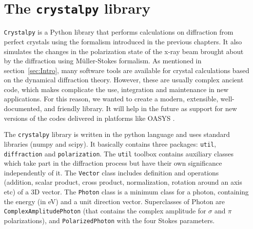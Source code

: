 \documentclass[preprint]{iucr}              %
\newcommand{\todo}[1]{{\color{red}[TODO: "#1'']}}
\newcommand{\inred}[1]{{\color{red}#1}}
\begin{document}




\section{The {\tt crystalpy} library}
\label{sec:crystalpy}

{\tt Crystalpy} is a Python library that performs calculations on diffraction
from perfect crystals using the formalism introduced in the previous chapters. It also simulates the changes in the polarization state of the x-ray beam brought
about by the diffraction using Müller-Stokes formalism. 
As mentioned in section~\ref{sec:Intro}, many software tools are available for crystal calculations based on the dynamical diffraction theory. However, these are usually complex ancient code, which makes complicate the use, integration and maintenance in new applications. For this reason, we wanted to create a modern, extensible, well-documented, and friendly library. It will help in the future as support for new versions of the codes delivered in platforms like OASYS \cite{codeOASYS}. 

The {\tt crystalpy} library is written in the python language and uses standard libraries (numpy and scipy).
It basically contains three
packages: {\tt util}, {\tt diffraction} and {\tt polarization}.
The {\tt util} toolbox contains auxiliary classes which take part in the diffraction
process but have their own significance independently of it.
 The {\tt Vector} class includes definition and operations (addition, scalar product, cross product, normalization, rotation around
an axis etc) of a 3D vector. 
The {\tt Photon} class is a minimum class for a photon, containing the energy (in eV) and a unit direction vector. Superclasses of Photon are {\tt ComplexAmplitudePhoton} (that contains the complex amplitude for $\sigma$ and $\pi$ polarizations), and {\tt PolarizedPhoton} with the four Stokes parameters.
\end{document}
